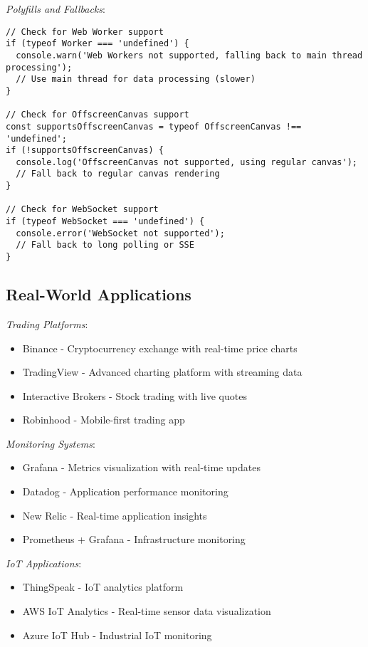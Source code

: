 \documentclass[11pt]{article}
\begin{document}
\emph{Polyfills and Fallbacks}:

\begin{verbatim}
// Check for Web Worker support
if (typeof Worker === 'undefined') {
  console.warn('Web Workers not supported, falling back to main thread processing');
  // Use main thread for data processing (slower)
}

// Check for OffscreenCanvas support
const supportsOffscreenCanvas = typeof OffscreenCanvas !== 'undefined';
if (!supportsOffscreenCanvas) {
  console.log('OffscreenCanvas not supported, using regular canvas');
  // Fall back to regular canvas rendering
}

// Check for WebSocket support
if (typeof WebSocket === 'undefined') {
  console.error('WebSocket not supported');
  // Fall back to long polling or SSE
}
\end{verbatim}
\subsection{Real-World Applications}
\label{sec:orge01b8f7}

\emph{Trading Platforms}:

\begin{itemize}
\item Binance - Cryptocurrency exchange with real-time price charts
\item TradingView - Advanced charting platform with streaming data
\item Interactive Brokers - Stock trading with live quotes
\item Robinhood - Mobile-first trading app
\end{itemize}

\emph{Monitoring Systems}:

\begin{itemize}
\item Grafana - Metrics visualization with real-time updates
\item Datadog - Application performance monitoring
\item New Relic - Real-time application insights
\item Prometheus + Grafana - Infrastructure monitoring
\end{itemize}

\emph{IoT Applications}:

\begin{itemize}
\item ThingSpeak - IoT analytics platform
\item AWS IoT Analytics - Real-time sensor data visualization
\item Azure IoT Hub - Industrial IoT monitoring
\end{itemize}
\end{document}
